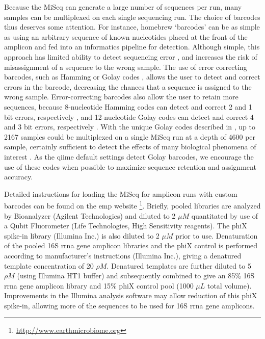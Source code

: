 Because the MiSeq can generate a large number of sequences per run, many samples can be multiplexed
on each single sequencing run. The choice of barcodes thus deserves some attention. For instance,
homebrew ‘barcodes’ can be as simple as using an arbitrary sequence of known nucleotides placed at
the front of the amplicon and fed into an informatics pipeline for detection. Although simple, this
approach has limited ability to detect sequencing error \cite{Caporaso2012}, and increases the risk
of misassignment of a sequence to the wrong sample. The use of error correcting barcodes, such as
Hamming \cite{Hamady2008} or Golay codes \cite{Caporaso2012}, allows the user to detect and correct
errors in the barcode, decreasing the chances that a sequence is assigned to the wrong sample.
Error-correcting barcodes also allow the user to retain more sequences, because 8-nucleotide Hamming
codes can detect and correct 2 and 1 bit errors, respectively \cite{Hamady2008}, and 12-nucleotide
Golay codes can detect and correct 4 and 3 bit errors, respectively \cite{Hamady2009}. With the
unique Golay codes described in \cite{Caporaso2012}, up to 2167 samples could be multiplexed on a
single MiSeq run at a depth of 4600 per sample, certainly sufficient to detect the effects of many
biological phenomena of interest \cite{Kuczynski2010, Kuczynski2010Patterns}. As the \gls{qiime}
default settings detect Golay barcodes, we encourage the use of these codes when possible to maximize
sequence retention and assignment accuracy.

Detailed instructions for loading the MiSeq for amplicon runs with custom barcodes can be found on
the \gls{emp} website \footnote{\url{http://www.earthmicrobiome.org}}. Briefly, pooled libraries are
analyzed by Bioanalyzer (Agilent Technologies) and diluted to 2 $\mu M$ quantitated by use of a
Qubit Fluorometer (Life Technologies, High Sensitivity reagents). The phiX spike-in library
(Illumina Inc.) is also diluted to 2 $\mu M$ prior to use. Denaturation of the pooled 16S \gls{rrna}
gene amplicon libraries and the phiX control is performed according to manufacturer's
instructions (Illumina Inc.), giving a denatured template concentration of 20 $\rho M$. Denatured
templates are further diluted to 5 $\rho M$ (using Illumina HT1 buffer) and subsequently combined to
give an 85\% 16S \gls{rrna} gene amplicon library and 15\% phiX control pool (1000 $\mu L$ total volume).
Improvements in the Illumina analysis software may allow reduction of this phiX spike-in, allowing more
of the sequences to be used for 16S \gls{rrna} gene amplicons.

